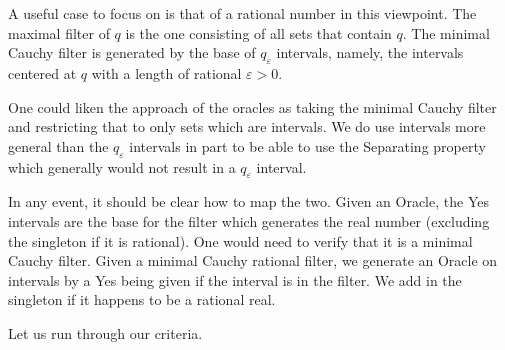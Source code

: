 \documentclass[12pt]{article}
\theoremstyle{remark}
\begin{document}
A useful case to focus on is that of a rational number in this viewpoint. The maximal filter of $q$ is the one consisting of all sets that contain $q$. The minimal Cauchy filter is generated by the base of $q_{\varepsilon}$ intervals, namely, the intervals centered at $q$ with a length of rational $\varepsilon>0$.

One could liken the approach of the oracles as taking the minimal Cauchy filter and restricting that to only sets which are intervals. We do use intervals more general than the $q_{\varepsilon}$ intervals in part to be able to use the Separating property which generally would not result in a $q_\varepsilon$ interval. 

In any event, it should be clear how to map the two. Given an Oracle, the Yes intervals are the base for the filter which generates the real number (excluding the singleton if it is rational). One would need to verify that it is a minimal Cauchy filter. Given a minimal Cauchy rational filter, we generate an Oracle on intervals by a Yes being given if the interval is in the filter. We add in the singleton if it happens to be a rational real. 

Let us run through our criteria. 
\end{document}
